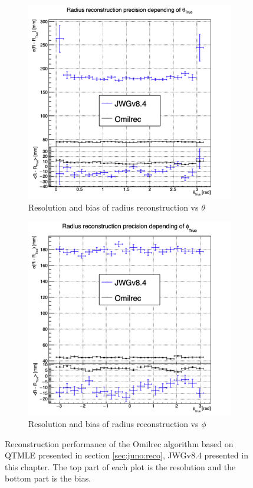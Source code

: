 \documentclass[../main.tex]{subfiles}
\begin{document}
\begin{figure}
  \begin{subfigure}[t]{0.48\linewidth}
    \centering
    \includegraphics[width=\linewidth]{images/jgnn/MSBvTT_nox.png}
    \caption{Resolution and bias of radius reconstruction vs $\theta$}
    \label{fig:jgnn:MSBvTTC_nox}
  \end{subfigure}
  \begin{subfigure}[t]{0.48\linewidth}
    \centering
    \includegraphics[width=\linewidth]{images/jgnn/MSBvPT_nox.png}
    \caption{Resolution and bias of radius reconstruction vs $\phi$}
    \label{fig:jgnn:MSBvPTC_nox}
  \end{subfigure}
  \caption{Reconstruction performance of the Omilrec algorithm based on QTMLE presented in section \ref{sec:juno:reco}, JWGv8.4 presented in this chapter. The top part of each plot is the resolution and the bottom part is the bias.}
  \label{fig:jgnn:results_nox_3}
\end{figure}
\end{document}
